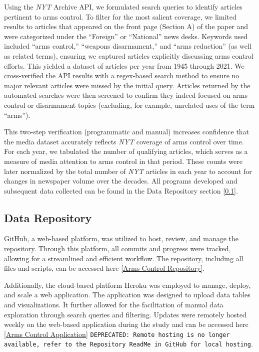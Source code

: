 \documentclass[11,5 pt]{article}
\begin{document}
    Using the \textit{NYT} Archive API, we formulated search queries to identify articles pertinent to arms control. To filter for the most salient coverage, we limited results to articles that appeared on the front page (Section A) of the paper and were categorized under the “Foreign” or “National” news desks. Keywords used included “arms control,” “weapons disarmament,” and “arms reduction” (as well as related terms), ensuring we captured articles explicitly discussing arms control efforts. This yielded a dataset of articles per year from 1945 through 2021. We cross-verified the API results with a regex-based search method to ensure no major relevant articles were missed by the initial query. Articles returned by the automated searches were then screened to confirm they indeed focused on arms control or disarmament topics (excluding, for example, unrelated uses of the term “arms”). 
    
    This two-step verification (programmatic and manual) increases confidence that the media dataset accurately reflects \textit{NYT} coverage of arms control over time. For each year, we tabulated the number of qualifying articles, which serves as a measure of media attention to arms control in that period. These counts were later normalized by the total number of \textit{NYT} articles in each year to account for changes in newspaper volume over the decades. All programs developed and subsequent data collected can be found in the Data Repository section [\ref{section:Data}].     

\subsection{Data Repository}
    \label{section:Data}
    
    GitHub, a web-based platform, was utilized to host, review, and manage the repository. Through this platform, all commits and progress were tracked, allowing for a streamlined and efficient workflow. The repository, including all files and scripts, can be accessed here \href{https://github.com/EthanMasters23/ArmsControlProject.git}{[Arms Control Repository]}.
    
    Additionally, the cloud-based platform Heroku was employed to manage, deploy, and scale a web application. The application was designed to upload data tables and visualizations. It further allowed for the facilitation of manual data exploration through search queries and filtering. Updates were remotely hosted weekly on the web-based application during the study and can be accessed here \href{https://np-research-app-ethan-masters.herokuapp.com}{[Arms Control Application]} \texttt{DEPRECATED: Remote hosting is no longer available, refer to the Repository ReadMe in GitHub for local hosting}. 
\end{document}
